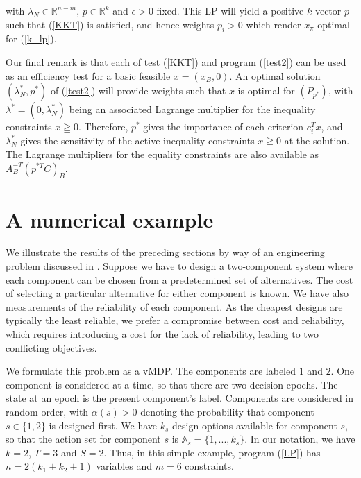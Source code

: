 \documentclass{article}
\theoremstyle{definition}
\numberwithin{equation}{section}
\begin{document}
with $\lambda_N \in \mathbb{R}^{n-m}$, $p \in \mathbb{R}^{k}$ and $\epsilon>0$ fixed. 
This LP will yield a positive $k$-vector $p$ such that (\ref{KKT}) is satisfied, and hence weights $p_i > 0$ which render $x_{\pi}$ optimal for (\ref{k_lp}).



Our final remark is that each of test (\ref{KKT}) and program (\ref{test2}) can be used as an efficiency test for a basic feasible $x=(x_B,0)$. An optimal solution $(\lambda_N^*,p^*)$
of (\ref{test2}) will provide weights such that $x$ is optimal for $(P_{p^*})$, with $\lambda^*=(0,\lambda_N^*)$
being an associated Lagrange multiplier for the inequality constraints $x\geqq 0$. Therefore, $p^*$ gives
the importance of each criterion $c_i^Tx$, and $\lambda_N^*$ gives the sensitivity of the active
inequality constraints $x\geqq 0$ at the solution. The Lagrange multipliers for the equality constraints
are also available as $A_B^{-T}(p^{*T}C)_B$.
\\

\section{A numerical example}
\label{sect_numeric}
We illustrate the results of the preceding sections
by way of an engineering problem discussed in \cite{22}. Suppose we have to design a two-component system where each component can be chosen from a predetermined set of alternatives. The cost of selecting a particular alternative for either component is known. We have also measurements of the reliability
of each component.
As
the cheapest designs are typically the least reliable, 
we prefer a compromise between cost and reliability, 
which requires introducing a cost for the lack of reliability, 
leading to two conflicting objectives. 


We formulate this problem as a vMDP. 
The components are labeled $1$ and $2$. One component is  considered at a time, so that there are two decision epochs. The state at an epoch is the present component's label. 
Components are considered in random order, with $\alpha(s) > 0$ denoting the probability that component $s \in \{ 1, 2\}$ is designed first. We have $k_s$ design options available for component $s$, so that the action set for component $s$ is $\mathbb{A}_s = \{1, ..., k_s\}$. In our notation, we have $k = 2$, $T = 3$ and $S= 2$. Thus, in this simple example, program (\ref{LP}) has $n = 2(k_1 + k_2 + 1)$ variables and $m = 6$ constraints.
\end{document}
